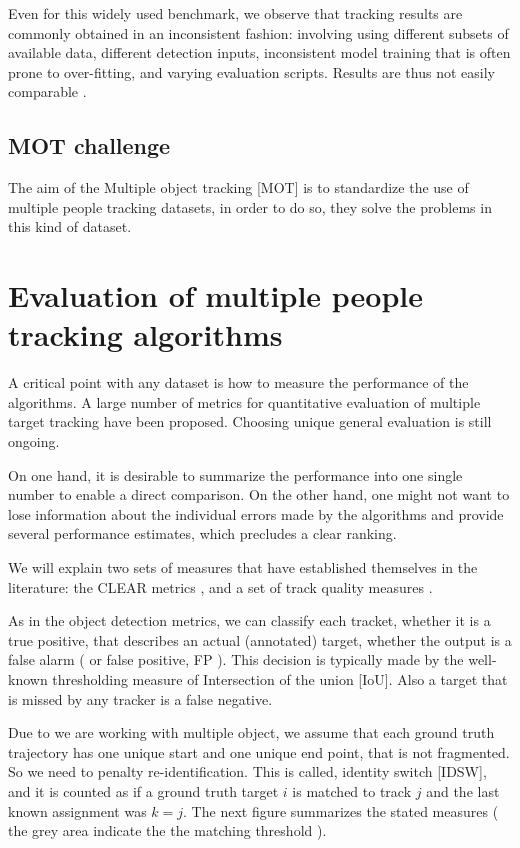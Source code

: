 Even for this widely used benchmark, we observe that tracking results are commonly obtained in an inconsistent fashion: involving using different subsets of available data, different detection inputs, inconsistent model training that is often prone to over-fitting, and varying evaluation scripts. Results are thus not easily comparable \cite{mot}.


\subsection{MOT challenge}

The aim of the Multiple object tracking [MOT] is to standardize the use of multiple people tracking datasets, in order to do so, they solve the problems in this kind of dataset.


\section{Evaluation of multiple people tracking algorithms}\label{datasetracksEval}

A critical point with any dataset is how to measure the performance of the algorithms. A large number of metrics for quantitative evaluation of multiple target tracking have been proposed. Choosing unique general evaluation is still ongoing. 

On one hand, it is desirable to summarize the performance into one single number to enable a direct comparison. On the other hand, one might not want to lose information about the individual errors made by the algorithms and provide several performance estimates, which precludes a clear ranking.


We will explain two sets of measures that have established themselves in the literature: the CLEAR metrics \cite{clear}, and a set of track quality measures \cite{wu}.

As in the object detection metrics, we can classify each tracket, whether it is a true positive, that describes an actual (annotated) target, whether the output is a false alarm ( or false positive, FP ). This decision is typically made by the well-known thresholding measure of Intersection of the union [IoU]. Also a target that is missed by any tracker is a false negative.

Due to we are working with multiple object, we assume that each ground truth trajectory has one unique start and one unique end point, that is not fragmented. So we need to penalty re-identification. This is called, identity switch [IDSW], and it is counted as if a ground truth target $i$ is matched to track $j$ and the last known assignment was $ k = j$. The next figure summarizes the stated measures ( the grey area indicate the the matching threshold ).


